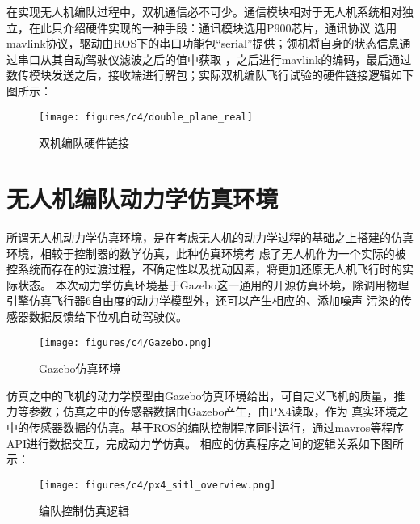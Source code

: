在实现无人机编队过程中，双机通信必不可少。通信模块相对于无人机系统相对独立，在此只介绍硬件实现的一种手段：通讯模块选用P900芯片，通讯协议
选用mavlink协议，驱动由ROS下的串口功能包“serial”提供；领机将自身的状态信息通过串口从其自动驾驶仪滤波之后的值中获取
，之后进行mavlink的编码，最后通过数传模块发送之后，接收端进行解包；实际双机编队飞行试验的硬件链接逻辑如下图所示：
\begin{figure}[H]
    \centering
    \texttt{[image: figures/c4/double\_plane\_real]}
    \caption{双机编队硬件链接}\label{fig:c4-double_plane_real}
\end{figure}
\section{无人机编队动力学仿真环境}
所谓无人机动力学仿真环境，是在考虑无人机的动力学过程的基础之上搭建的仿真环境，相较于控制器的数学仿真，此种仿真环境考
虑了无人机作为一个实际的被控系统而存在的过渡过程，不确定性以及扰动因素，将更加还原无人机飞行时的实际状态。
本次动力学仿真环境基于Gazebo这一通用的开源仿真环境，除调用物理引擎仿真飞行器6自由度的动力学模型外，还可以产生相应的、添加噪声
污染的传感器数据反馈给下位机自动驾驶仪。
\begin{figure}[H]
    \centering
    \texttt{[image: figures/c4/Gazebo.png]}
    \caption{Gazebo仿真环境}\label{fig:c4-Gazebo}
\end{figure}

仿真之中的飞机的动力学模型由Gazebo仿真环境给出，可自定义飞机的质量，推力等参数；仿真之中的传感器数据由Gazebo产生，由PX4读取，作为
真实环境之中的传感器数据的仿真。基于ROS的编队控制程序同时运行，通过mavros等程序API进行数据交互，完成动力学仿真。
相应的仿真程序之间的逻辑关系如下图所示：
\begin{figure}[H]
    \centering
    \texttt{[image: figures/c4/px4\_sitl\_overview.png]}
    \caption{编队控制仿真逻辑}\label{fig:px4_sitl_overview}
\end{figure}
